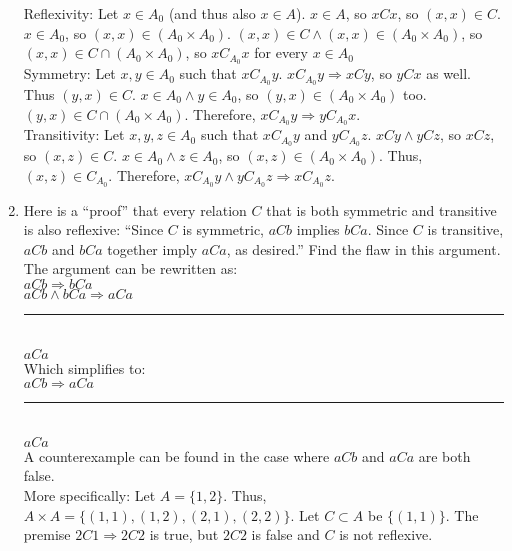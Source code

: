 \documentclass{article}
\begin{document}
\begin{enumerate}
            Reflexivity: Let $x \in A_{0}$ (and thus also $x \in A$). $x \in A$, so $xCx$, so $(x, x) \in C$. $x \in A_{0}$, so $(x, x) \in (A_{0} \times A_{0})$. $(x, x) \in C \land (x, x) \in (A_{0} \times A_{0})$, so $(x, x) \in C \cap (A_{0} \times A_{0})$, so $xC_{A_{0}}x$ for every $x \in A_{0}$\\
            Symmetry: Let $x, y \in A_{0}$ such that $xC_{A_{0}}y$. $xC_{A_{0}}y \Rightarrow xCy$, so $yCx$ as well. Thus $(y, x) \in C$. $x \in A_{0} \land y \in A_{0}$, so $(y, x) \in (A_{0} \times A_{0})$ too. $(y, x) \in C \cap (A_{0} \times A_{0})$. Therefore, $xC_{A_{0}}y \Rightarrow yC_{A_{0}}x$.\\
            Transitivity: Let $x, y, z \in A_{0}$ such that $xC_{A_{0}}y$ and $yC_{A_{0}}z$. $xCy \land yCz$, so $xCz$, so $(x, z) \in C$. $x \in A_{0} \land z \in A_{0}$, so $(x, z) \in (A_{0} \times A_{0})$. Thus, $(x, z) \in C_{A_{0}}$. Therefore, $xC_{A_{0}}y \land yC_{A_{0}}z \Rightarrow xC_{A_{0}}z$.
      \item Here is a “proof” that every relation $C$ that is both symmetric and transitive is also reflexive: “Since $C$ is symmetric, $aCb$ implies $bCa$. Since $C$ is transitive, $aCb$ and $bCa$ together imply $aCa$, as desired.” Find the flaw in this argument.\\
            The argument can be rewritten as:\\
            $aCb \Rightarrow bCa$\\
            $aCb \land bCa \Rightarrow aCa$\\
            \rule{5em}{.5pt}\\
            $aCa$\\
            Which simplifies to:\\
            $aCb \Rightarrow aCa$\\
            \rule{5em}{.5pt}\\
            $aCa$\\
            A counterexample can be found in the case where $aCb$ and $aCa$ are both false.\\
            More specifically: Let $A = \{1, 2\}$. Thus, $A \times A = \{(1, 1), (1, 2), (2, 1), (2, 2)\}$. Let $C \subset A$ be $\{(1, 1)\}$. The premise $2C1 \Rightarrow 2C2$ is true, but $2C2$ is false and $C$ is not reflexive.


\end{enumerate}
\end{document}
